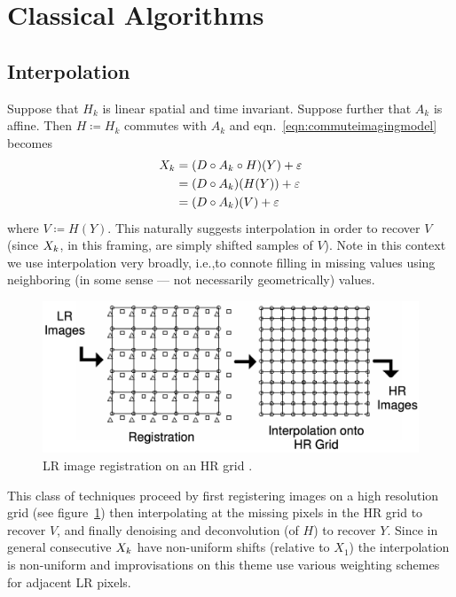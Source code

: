 \section{Classical Algorithms}\label{sec:classical-algorithms}
\localtableofcontents
\subsection{Interpolation}\label{subsec:interpolation}

Suppose that \(H_k\) is linear spatial and time invariant.
%
Suppose further that \(A_k\) is affine.
%
Then \(H \coloneqq H_k\) commutes with \(A_k\) \cite{meladcommute} and eqn.~\eqref{eqn:commuteimagingmodel} becomes
\begin{equation}
    \label{eqn:commuteimagingmodel}
    \begin{split}
        X_k &= (D \circ A_k \circ H) (Y) + \varepsilon \\
        &= (D \circ A_k) (H(Y)) + \varepsilon \\
        &= (D \circ A_k) (V) + \varepsilon
    \end{split}
\end{equation}
%
where \(V \coloneqq H(Y)\).
%
This naturally suggests interpolation in order to recover \(V\) (since \(X_k\), in this framing, are simply shifted samples of \(V\)).
%
Note in this context we use interpolation very broadly, i.e.,to connote filling in missing values using neighboring (in some sense --- not necessarily geometrically) values.
%
\begin{figure}
    \centering
    \includegraphics[width=\linewidth,keepaspectratio]{figures/classical/hrgrid.png}
    \caption{LR image registration on an HR grid \cite{Lin}.}
    \label{fig:hrgrid}
\end{figure}
This class of techniques proceed by first registering images on a high resolution grid (see figure~\ref{fig:hrgrid}) then interpolating at the missing pixels in the HR grid to recover \(V\), and finally denoising and deconvolution (of \(H\)) to recover \(Y\).
%
Since in general consecutive \(X_k\) have non-uniform shifts (relative to \(X_1\)) the interpolation is non-uniform and improvisations on this theme use various weighting schemes for adjacent LR pixels.


